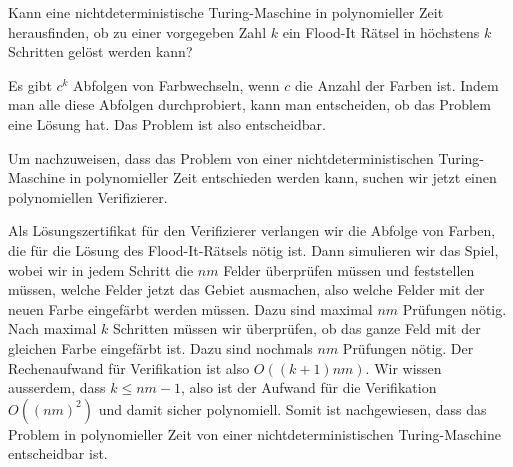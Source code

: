 \begin{center}
\end{center}
Kann eine nichtdeterministische Turing-Maschine in polynomieller Zeit 
herausfinden, ob zu einer vorgegeben Zahl $k$ ein Flood-It
Rätsel in höchstens $k$ Schritten gelöst werden kann?


\begin{loesung}
Es gibt $c^k$ Abfolgen von Farbwechseln, wenn $c$ die Anzahl der Farben ist.
Indem man alle diese Abfolgen durchprobiert, kann man entscheiden, ob
das Problem eine Lösung hat.
Das Problem ist also entscheidbar.

Um nachzuweisen, dass das Problem von einer nichtdeterministischen
Turing-Maschine in polynomieller Zeit entschieden werden kann,
suchen wir jetzt einen polynomiellen Verifizierer.

Als Lösungszertifikat für den Verifizierer verlangen wir die Abfolge
von Farben, die für die Lösung des Flood-It-Rätsels nötig ist.
Dann simulieren wir das Spiel, wobei wir in jedem Schritt
die $nm$ Felder überprüfen müssen und feststellen müssen, welche
Felder jetzt das Gebiet ausmachen, also welche Felder mit der neuen
Farbe eingefärbt werden müssen.
Dazu sind maximal $nm$ Prüfungen nötig.
Nach maximal $k$ Schritten müssen wir überprüfen, ob das ganze Feld
mit der gleichen Farbe eingefärbt ist.
Dazu sind nochmals $nm$ Prüfungen nötig.
Der Rechenaufwand für Verifikation ist also $O((k+1)nm)$.
Wir wissen ausserdem, dass $k\le nm-1$, also ist der Aufwand für die
Verifikation $O((nm)^2)$ und damit sicher polynomiell.
Somit ist nachgewiesen, dass das Problem in polynomieller Zeit von
einer nichtdeterministischen Turing-Maschine entscheidbar ist.
\end{loesung}

